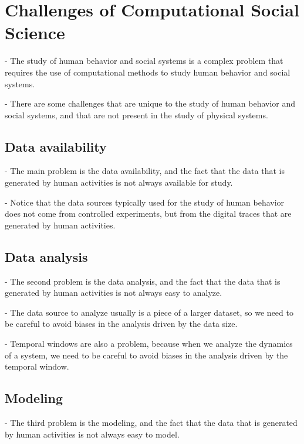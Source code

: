 \section{\label{sec:Challenges of Computational Social Science} Challenges of Computational Social Science}

- The study of human behavior and social systems is a complex problem that requires the use of computational methods to study human behavior and social systems.

- There are some challenges that are unique to the study of human behavior and social systems, and that are not present in the study of physical systems.

\subsection{\label{subsec:Data availability} Data availability}

- The main problem is the data availability, and the fact that the data that is generated by human activities is not always available for study.

- Notice that the data sources typically used for the study of human behavior does not come from controlled experiments, but from the digital traces that are generated by human activities.

\subsection{\label{subsec:Data analysis} Data analysis}

- The second problem is the data analysis, and the fact that the data that is generated by human activities is not always easy to analyze.

- The data source to analyze usually is a piece of a larger dataset, so we need to be careful to avoid biases in the analysis driven by the data size.

- Temporal windows are also a problem, because when we analyze the dynamics of a system, we need to be careful to avoid biases in the analysis driven by the temporal window.

\subsection{\label{subsec:Modeling} Modeling}

- The third problem is the modeling, and the fact that the data that is generated by human activities is not always easy to model. 


